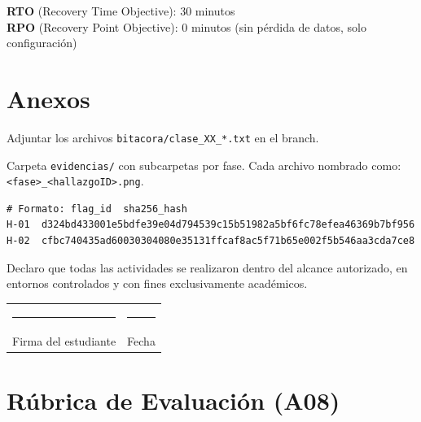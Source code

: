 \documentclass[11pt,a4paper]{article}
\begin{document}
\begin{campo}
\textbf{RTO} (Recovery Time Objective): 30 minutos \\
\textbf{RPO} (Recovery Point Objective): 0 minutos (sin pérdida de datos, solo configuración)
\end{campo}

\section{Anexos}

\begin{campo}
Adjuntar los archivos \texttt{bitacora/clase\_XX\_*.txt} en el branch.
\end{campo}

\begin{campo}
Carpeta \texttt{evidencias/} con subcarpetas por fase. Cada archivo nombrado como: \texttt{<fase>\_<hallazgoID>.png}.
\end{campo}

\begin{campo}
\begin{lstlisting}
# Formato: flag_id  sha256_hash
H-01  d324bd433001e5bdfe39e04d794539c15b51982a5bf6fc78efea46369b7bf956
H-02  cfbc740435ad60030304080e35131ffcaf8ac5f71b65e002f5b546aa3cda7ce8
\end{lstlisting}
\end{campo}

\begin{campo}
Declaro que todas las actividades se realizaron dentro del alcance autorizado, en entornos controlados y con fines exclusivamente académicos.\\[0.4cm]
\begin{tabularx}{\textwidth}{@{} X X @{}}
\rule{6cm}{0.4pt} & \rule{6cm}{0.4pt} \\
Firma del estudiante & Fecha \\
\end{tabularx}
\end{campo}

\section{Rúbrica de Evaluación (A08)}
\end{document}
